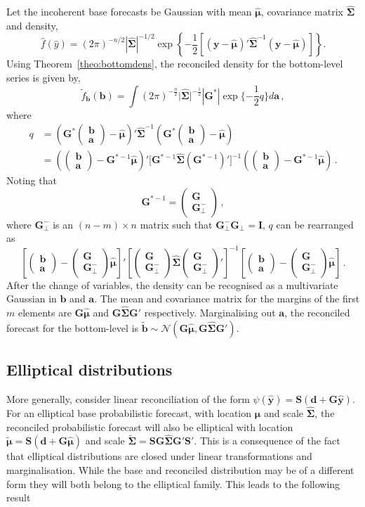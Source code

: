 \documentclass[12pt]{article}
\def\PQ{\begin{pmatrix}\bm{G}\\[-0.2cm]\bm{G}_{\perp}^-\end{pmatrix}}
\def\bt{\begin{pmatrix}{\bm{b}}\\[-0.2cm]{\bm{a}}\end{pmatrix}}
\theoremstyle{definition}
\begin{document}
Let the incoherent base forecasts be Gaussian with mean $\hat{\bm{\mu}}$, covariance matrix $\hat{\bm{\Sigma}}$ and density,
\begin{equation}
\hat{f}(\hat{y})=(2\pi)^{-n/2}|\hat{\bm{\Sigma}}|^{-1/2}\exp\left\{-\frac{1}{2}\left[({\bm{y}}-\hat{\bm{\mu}})'\hat{\bm{\Sigma}}^{-1}({\bm{y}}-\hat{\bm{\mu}})\right]\right\}\nonumber.
\end{equation}
Using Theorem~\ref{theo:bottomdens}, the reconciled density for the bottom-level series is given by,
\begin{equation}
\tilde{f}_{\bm{b}}(\bm{b})=\int(2\pi)^{-\frac{n}{2}}\Big|\hat{\bm{\Sigma}}\Big|^{-\frac{1}{2}}|\bm{G^*}|\exp\{-\frac{1}{2}q\}d{\bm a}\nonumber\,,
\end{equation}
where
\begin{align*}
	q& =
	\left(\bm{G}^*\bt-\hat{\bm{\mu}}\right)' \hat{\bm{\Sigma}}^{-1}\left(\bm{G}^*\bt-\hat{\bm{\mu}}\right)\\
	& =
	\left(\bt-\bm{G}^{*-1}\hat{\bm{\mu}}\right)' \Big[\bm{G}^{*-1}\hat{\bm{\Sigma}}\left(\bm{G}^{*-1}\right)'\Big]^{-1}
	\left(\bt-\bm{G}^{*-1}\hat{\bm{\mu}}\right)\,.
\end{align*}
Noting that
\[
\bm{G}^{*-1}=\begin{pmatrix}
\bm{G} \\\bm{G}_{\perp}^-
\end{pmatrix}\,,
\]
where $\bm{G}_{\perp}^-$ is an $(n-m)\times n$ matrix such that $\bm{G}_{\perp}^-\bm{G}_{\perp}=\bm{I}$, $q$ can be rearranged as
\[
 \left[\bt-\PQ\hat{\bm{\mu}}\right]' \left[\PQ\hat{\bm{\Sigma}}\PQ'\right]^{-1}\left[\bt-\PQ\hat{\bm{\mu}}\right]\,.
\]
After the change of variables, the density can be recognised as a multivariate Gaussian in $\bm{b}$ and $\bm{a}$.  The mean and covariance matrix for the margins of the first $m$ elements are $\bm{G}\hat{\bm{\mu}}$ and $\bm{G}\hat{\bm{\Sigma}}\bm{G}'$ respectively.  Marginalising out $\bm {a}$, the reconciled forecast for the bottom-level is $\tilde{\bm{b}} \sim \mathcal{N}(\bm{G}\hat{\bm{\mu}}, \bm{G}\hat{\bm{\Sigma}}\bm{G}')$.


\subsection{Elliptical distributions}\label{sec:elliptical}

More generally, consider linear reconciliation of the form $\psi(\hat{\bm{y}})=\bm{S}(\bm{d}+\bm{G}\hat{\bm{y}})$.  For an elliptical base probabilistic forecast, with location $\hat{\bm\mu}$ and scale $\hat{\bm\Sigma}$, the reconciled probabilistic forecast will also be elliptical with location $\tilde{\bm{\mu}}=\bm{S}(\bm{d}+\bm{G}\hat{\bm{\mu}})$ and scale   $\tilde{\bm{\Sigma}}=\bm{S}\bm{G}\hat{\bm{\Sigma}}\bm{G}'\bm{S}'$.  This is a consequence of the fact that elliptical distributions are closed under linear transformations and marginalisation. While the base and reconciled distribution may be of a different form they will both belong to the elliptical family.  This leads to the following result
\end{document}
